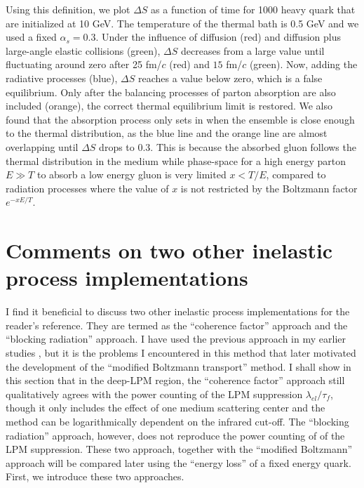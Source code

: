 Using this definition, we plot $\Delta S$ as a function of time for 1000 heavy quark that are initialized at 10 GeV.
The temperature of the thermal bath is 0.5 GeV and we used a fixed $\alpha_s = 0.3$.
Under the influence of diffusion (red) and diffusion plus large-angle elastic collisions (green), $\Delta S$ decreases from a large value until fluctuating around zero after 25 fm/$c$ (red) and $15$ fm/$c$ (green).
Now, adding the radiative processes (blue), $\Delta S$ reaches a value below zero, which is a false equilibrium.
Only after the balancing processes of parton absorption are also included (orange), the correct thermal equilibrium limit is restored. 
We also found that the absorption process only sets in when the ensemble is close enough to the thermal distribution, as the blue line and the orange line are almost overlapping until $\Delta S$ drops to 0.3.
This is because the absorbed gluon follows the thermal distribution in the medium while phase-space for a high energy parton $E\gg T$ to absorb a low energy gluon is very limited $x<T/E$, compared to radiation processes where the value of $x$ is not restricted by the Boltzmann factor $e^{-xE/T}$.

\section{Comments on two other inelastic process implementations}
\label{section:compare_former}
I find it beneficial to discuss two other inelastic process implementations for the reader's reference. 
They are termed as the ``coherence factor'' approach and the ``blocking radiation'' approach.
I have used the previous approach in my earlier studies \cite{Ke:2018tsh}, but it is the problems I encountered in this method that later motivated the development of the ``modified Boltzmann transport'' method. 
I shall show in this section that in the deep-LPM region, the ``coherence factor'' approach still qualitatively agrees with the power counting of the LPM suppression $\lambda_{el}/\tau_f$, though it only includes the effect of one medium scattering center and the method can be logarithmically dependent on the infrared cut-off.
The ``blocking radiation'' approach, however,  does not reproduce the power counting of of the LPM suppression.
These two approach, together with the ``modified Boltzmann'' approach will be compared later using the ``energy loss'' of a fixed energy quark.
First, we introduce these two approaches.

